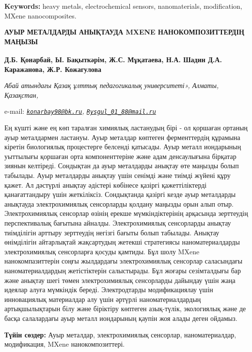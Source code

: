 {\bfseries Keywords:} heavy metals, electrochemical sensors, nanomaterials,
modification, MXene nanocomposites.

\begin{articleheader}
{\bfseries АУЫР МЕТАЛДАРДЫ АНЫҚТАУДА MXENE НАНОКОМПОЗИТТЕРДІҢ МАҢЫЗЫ}

{\bfseries
Д.Б. Қонарбай\textsuperscript{\envelope },
Ы. Бақыткәрім\textsuperscript{\envelope },
Ж.С. Мұқатаева,
Н.А. Шадин
Д.А. Каражанова,
Ж.Р. Кожагулова}
\end{articleheader}

\begin{affiliation}
\emph{Абай атындағы Қазақ ұлттық педагогикалық университеті», Алматы, Қазақстан,}

e-mail: \emph{\href{mailto:konarbay98@bk.ru}{\nolinkurl{konarbay98@bk.ru}}, \href{mailto:Rysgul_01_88@mail.ru}{\nolinkurl{Rysgul\_01\_88@mail.ru}}}
\end{affiliation}

Ең күшті және ең көп таралған химиялық ластанудың бірі - ол қоршаған
ортаның ауыр металдармен ластануы. Ауыр металдар көптеген ферменттердің
құрамына кіретін биологиялық процестерге белсенді қатысады. Ауыр металл
иондарының уыттылығы қоршаған орта компоненттеріне және адам
денсаулығына бірқатар зиянын келтіреді. Сондықтан да ауыр металдарды
анықтау өте маңызды болып табылады. Ауыр металдарды анықтау үшін сенімді
және тиімді жүйені құру қажет. Ал дәстүрлі анықтау әдістері көбінесе
қазіргі қажеттіліктерді қанағаттандыру үшін жеткіліксіз. Сондықтанда
қазіргі кезде ауыр металдарды анықтауда электрохимиялық сенсорларды
қолдану маңызды орын алып отыр. Электрохимиялық сенсорлар өзінің ерекше
мүмкіндіктерінің арқасында зерттеудің перспективалық бағытына айналды.
Электрохимиялық сенсорларды анықтау тиімділігін арттыру зерттеудің
негізгі бағыты болып табылады. Анықтау өнімділігін айтарлықтай
жақсартудың жетекші стратегиясы наноматериалдарды электрохимиялық
сенсорларға қосуды қамтиды. Бұл шолу MXene нанокомпазиттерін
соңғы жылдардағы электрохимиялық сенсорлар саласындағы
наноматериалдардың жетістіктерін салыстырады. Бұл жоғары
сезімталдығы бар және анықтау шегі төмен электрохимиялық
сенсорларды дайындау үшін жаңа идеялар алуға мүмкіндік береді.
Электродтарды модификациялау үшін инновациялық материалдар алу
үшін әртүрлі наноматериалдардың артықшылықтарын білу және
біріктіру көптеген азық-түлік, экологиялық және де басқа
салалардағы ауыр металл иондарының қаупін жоя алады деген
ойдамыз.

{\bfseries Түйін сөздер:} Ауы{\bfseries }р металдар, электрохимиялық
сенсорлар, наноматериалдар, модификация, MXene нанокомпозиттері.

